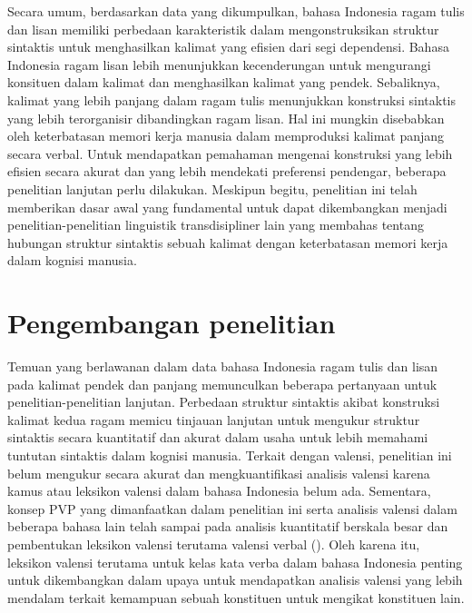 Secara umum, berdasarkan data yang dikumpulkan, bahasa Indonesia ragam tulis dan lisan memiliki perbedaan karakteristik dalam mengonstruksikan struktur sintaktis untuk menghasilkan kalimat yang efisien dari segi dependensi. Bahasa Indonesia ragam lisan lebih menunjukkan kecenderungan untuk mengurangi konsituen dalam kalimat dan menghasilkan kalimat yang pendek. Sebaliknya, kalimat yang lebih panjang dalam ragam tulis menunjukkan konstruksi sintaktis yang lebih terorganisir dibandingkan ragam lisan. Hal ini mungkin disebabkan oleh keterbatasan memori kerja manusia dalam memproduksi kalimat panjang secara verbal. Untuk mendapatkan pemahaman mengenai konstruksi yang lebih efisien secara akurat dan yang lebih mendekati preferensi pendengar, beberapa penelitian lanjutan perlu dilakukan. Meskipun begitu, penelitian ini telah memberikan dasar awal yang fundamental untuk dapat dikembangkan menjadi penelitian-penelitian linguistik transdisipliner lain yang membahas tentang hubungan struktur sintaktis sebuah kalimat dengan keterbatasan memori kerja dalam kognisi manusia.

\section{Pengembangan penelitian}

Temuan yang berlawanan dalam data bahasa Indonesia ragam tulis dan lisan pada kalimat pendek dan panjang memunculkan beberapa pertanyaan untuk penelitian-penelitian lanjutan. Perbedaan struktur sintaktis akibat konstruksi kalimat kedua ragam memicu tinjauan lanjutan untuk mengukur struktur sintaktis secara kuantitatif dan akurat dalam usaha untuk lebih memahami tuntutan sintaktis dalam kognisi manusia. Terkait dengan valensi, penelitian ini belum mengukur secara akurat dan mengkuantifikasi analisis valensi karena kamus atau leksikon valensi dalam bahasa Indonesia belum ada. Sementara, konsep PVP \citep{liu2006syntactic} yang dimanfaatkan dalam penelitian ini serta analisis valensi dalam beberapa bahasa lain telah sampai pada analisis kuantitatif berskala besar dan pembentukan leksikon valensi terutama valensi verbal (\citealp{zabokrtsky2005valency, bielicky2008building, passarotti2016latin, semecky2006constructing}). Oleh karena itu, leksikon valensi terutama untuk kelas kata verba dalam bahasa Indonesia penting untuk dikembangkan dalam upaya untuk mendapatkan analisis valensi yang lebih mendalam terkait kemampuan sebuah konstituen untuk mengikat konstituen lain. 


